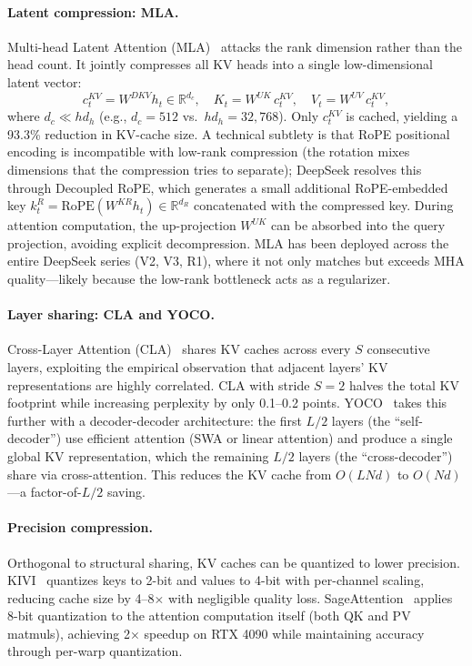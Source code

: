\paragraph{Latent compression: MLA.}
Multi-head Latent Attention (MLA)~\cite{deepseekv2_2024_mla} attacks the rank dimension rather than the head count. It jointly compresses all KV heads into a single low-dimensional latent vector:
\begin{equation}
c_t^{KV} = W^{DKV} h_t \in \mathbb{R}^{d_c}, \quad K_t = W^{UK}\, c_t^{KV}, \quad V_t = W^{UV}\, c_t^{KV},
\label{eq:mla}
\end{equation}
where $d_c \ll hd_h$ (e.g., $d_c = 512$ vs.\ $hd_h = 32{,}768$). Only $c_t^{KV}$ is cached, yielding a 93.3\% reduction in KV-cache size. A technical subtlety is that RoPE positional encoding is incompatible with low-rank compression (the rotation mixes dimensions that the compression tries to separate); DeepSeek resolves this through Decoupled RoPE, which generates a small additional RoPE-embedded key $k^R_t = \text{RoPE}(W^{KR} h_t) \in \mathbb{R}^{d_R}$ concatenated with the compressed key. During attention computation, the up-projection $W^{UK}$ can be absorbed into the query projection, avoiding explicit decompression. MLA has been deployed across the entire DeepSeek series (V2, V3, R1), where it not only matches but exceeds MHA quality---likely because the low-rank bottleneck acts as a regularizer.

\paragraph{Layer sharing: CLA and YOCO.}
Cross-Layer Attention (CLA)~\cite{brandon2024reducing} shares KV caches across every $S$ consecutive layers, exploiting the empirical observation that adjacent layers' KV representations are highly correlated. CLA with stride $S = 2$ halves the total KV footprint while increasing perplexity by only 0.1--0.2 points. YOCO~\cite{sun2024yoco} takes this further with a decoder-decoder architecture: the first $L/2$ layers (the ``self-decoder'') use efficient attention (SWA or linear attention) and produce a single global KV representation, which the remaining $L/2$ layers (the ``cross-decoder'') share via cross-attention. This reduces the KV cache from $O(LNd)$ to $O(Nd)$---a factor-of-$L/2$ saving.

\paragraph{Precision compression.}
Orthogonal to structural sharing, KV caches can be quantized to lower precision. KIVI~\cite{liu2024kivi} quantizes keys to 2-bit and values to 4-bit with per-channel scaling, reducing cache size by 4--8$\times$ with negligible quality loss. SageAttention~\cite{zhang2024sageattention} applies 8-bit quantization to the attention computation itself (both QK and PV matmuls), achieving 2$\times$ speedup on RTX 4090 while maintaining accuracy through per-warp quantization.

